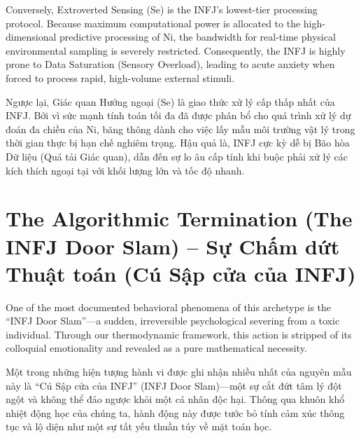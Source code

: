\documentclass{report}
\begin{document}
Conversely, Extroverted Sensing (Se) is the INFJ's lowest-tier processing protocol. Because maximum computational power is allocated to the high-dimensional predictive processing of Ni, the bandwidth for real-time physical environmental sampling is severely restricted. Consequently, the INFJ is highly prone to Data Saturation (Sensory Overload), leading to acute anxiety when forced to process rapid, high-volume external stimuli.

Ngược lại, Giác quan Hướng ngoại (Se) là giao thức xử lý cấp thấp nhất của INFJ. Bởi vì sức mạnh tính toán tối đa đã được phân bổ cho quá trình xử lý dự đoán đa chiều của Ni, băng thông dành cho việc lấy mẫu môi trường vật lý trong thời gian thực bị hạn chế nghiêm trọng. Hậu quả là, INFJ cực kỳ dễ bị Bão hòa Dữ liệu (Quá tải Giác quan), dẫn đến sự lo âu cấp tính khi buộc phải xử lý các kích thích ngoại tại với khối lượng lớn và tốc độ nhanh.

\section{The Algorithmic Termination (The INFJ Door Slam) -- Sự Chấm dứt Thuật toán (Cú Sập cửa của INFJ)}

One of the most documented behavioral phenomena of this archetype is the ``INFJ Door Slam''—a sudden, irreversible psychological severing from a toxic individual. Through our thermodynamic framework, this action is stripped of its colloquial emotionality and revealed as a pure mathematical necessity.

Một trong những hiện tượng hành vi được ghi nhận nhiều nhất của nguyên mẫu này là ``Cú Sập cửa của INFJ'' (INFJ Door Slam)—một sự cắt đứt tâm lý đột ngột và không thể đảo ngược khỏi một cá nhân độc hại. Thông qua khuôn khổ nhiệt động học của chúng ta, hành động này được tước bỏ tính cảm xúc thông tục và lộ diện như một sự tất yếu thuần túy về mặt toán học.
\end{document}
